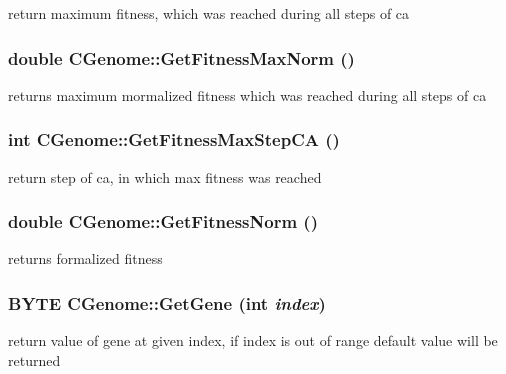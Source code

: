 \label{classCGenome_a5ca3b39ec73b06b0bd2c6c15e058c692}
return maximum fitness, which was reached during all steps of ca \hypertarget{classCGenome_a6feb7c58908885c43921300f80881852}{
\subsubsection[{GetFitnessMaxNorm}]{\setlength{\rightskip}{0pt plus 5cm}double CGenome::GetFitnessMaxNorm ()}}
\label{classCGenome_a6feb7c58908885c43921300f80881852}
returns maximum mormalized fitness which was reached during all steps of ca \hypertarget{classCGenome_add91fda87f3065245ca2cdf280272b60}{
\subsubsection[{GetFitnessMaxStepCA}]{\setlength{\rightskip}{0pt plus 5cm}int CGenome::GetFitnessMaxStepCA ()}}
\label{classCGenome_add91fda87f3065245ca2cdf280272b60}
return step of ca, in which max fitness was reached \hypertarget{classCGenome_a268d2a8008c2c56460e6de1df644c0c5}{
\subsubsection[{GetFitnessNorm}]{\setlength{\rightskip}{0pt plus 5cm}double CGenome::GetFitnessNorm ()}}
\label{classCGenome_a268d2a8008c2c56460e6de1df644c0c5}
returns formalized fitness \hypertarget{classCGenome_a63ed6158c66292bc3934b8b0321205a7}{
\subsubsection[{GetGene}]{\setlength{\rightskip}{0pt plus 5cm}BYTE CGenome::GetGene (int {\em index})}}
\label{classCGenome_a63ed6158c66292bc3934b8b0321205a7}
return value of gene at given index, if index is out of range default value will be returned


